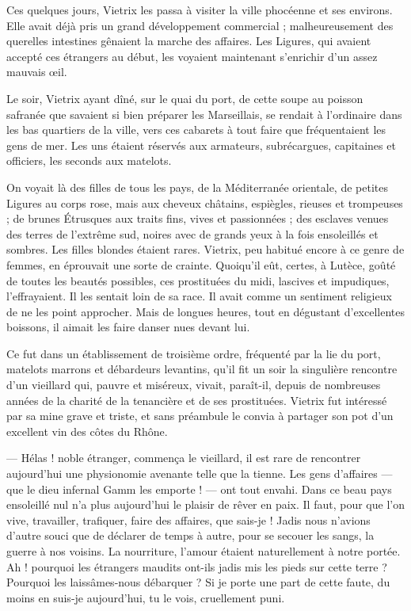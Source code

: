 \documentclass[a4paper, 11pt, oneside, polutonikogreek, french]{article}
\begin{document}
\bigskip
\centerline{\EightStarTaper}
\centerline{\EightStarTaper\EightStarTaper}
\bigskip

Ces quelques jours, Vietrix les passa à visiter la ville phocéenne et ses environs. Elle avait déjà pris un grand développement commercial ; malheureusement des querelles intestines gênaient la marche des affaires. Les Ligures, qui avaient accepté ces étrangers au début, les voyaient maintenant s'enrichir d'un assez mauvais œil.

Le soir, Vietrix ayant dîné, sur le quai du port, de cette soupe au poisson safranée que savaient si bien préparer les Marseillais, se rendait à l'ordinaire dans les bas quartiers de la ville, vers ces cabarets à tout faire que fréquentaient les gens de mer. Les uns étaient réservés aux armateurs, subrécargues, capitaines et officiers, les seconds aux matelots.

On voyait là des filles de tous les pays, de la Méditerranée orientale, de petites Ligures au corps rose, mais aux cheveux châtains, espiègles, rieuses et trompeuses ; de brunes Étrusques aux traits fins, vives et passionnées ; des esclaves venues des terres de l'extrême sud, noires avec de grands yeux à la fois ensoleillés et sombres. Les filles blondes étaient rares. Vietrix, peu habitué encore à ce genre de femmes, en éprouvait une sorte de crainte. Quoiqu'il eût, certes, à Lutèce, goûté de toutes les beautés possibles, ces prostituées du midi, lascives et impudiques, l'effrayaient. Il les sentait loin de sa race. Il avait comme un sentiment religieux de ne les point approcher. Mais de longues heures, tout en dégustant d'excellentes boissons, il aimait les faire danser nues devant lui.

Ce fut dans un établissement de troisième ordre, fréquenté par la lie du port, matelots marrons et débardeurs levantins, qu'il fit un soir la singulière rencontre d'un vieillard qui, pauvre et miséreux, vivait, paraît-il, depuis de nombreuses années de la charité de la tenancière et de ses prostituées. Vietrix fut intéressé par sa mine grave et triste, et sans préambule le convia à partager son pot d'un excellent vin des côtes du Rhône.

\bigskip
\centerline{\EightStarTaper}
\centerline{\EightStarTaper\EightStarTaper}
\bigskip

--- Hélas ! noble étranger, commença le vieillard, il est rare de rencontrer aujourd'hui une physionomie avenante telle que la tienne. Les gens d'affaires --- que le dieu infernal Gamm les emporte ! --- ont tout envahi. Dans ce beau pays ensoleillé nul n'a plus aujourd'hui le plaisir de rêver en paix. Il faut, pour que l'on vive, travailler, trafiquer, faire des affaires, que sais-je ! Jadis nous n'avions d'autre souci que de déclarer de temps à autre, pour se secouer les sangs, la guerre à nos voisins. La nourriture, l'amour étaient naturellement à notre portée. Ah ! pourquoi les étrangers maudits ont-ils jadis mis les pieds sur cette terre ? Pourquoi les laissâmes-nous débarquer ? Si je porte une part de cette faute, du moins en suis-je aujourd'hui, tu le vois, cruellement puni.
\end{document}
